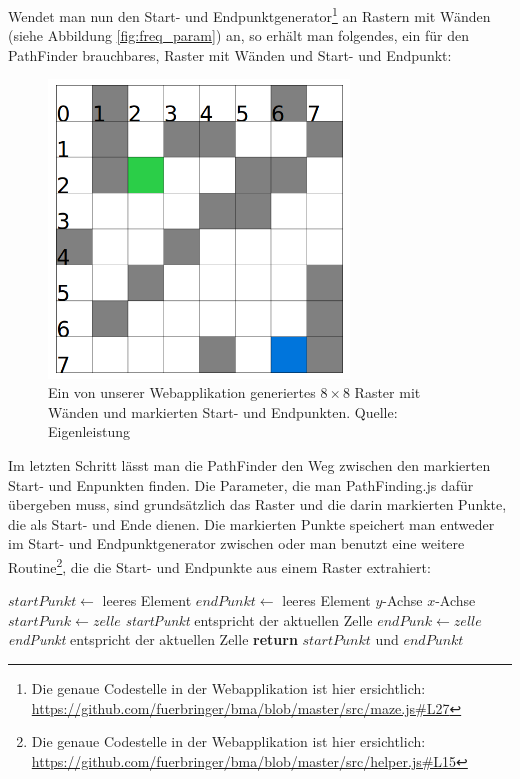 \documentclass[12pt,a4paper,german]{report}
\begin{document}
Wendet man nun den Start- und Endpunktgenerator\footnote{Die genaue Codestelle in der Webapplikation ist hier ersichtlich: \url{https://github.com/fuerbringer/bma/blob/master/src/maze.js\#L27}} an Rastern mit Wänden (siehe Abbildung \ref{fig:freq_param}) an, so erhält man folgendes, ein für den PathFinder brauchbares, Raster mit Wänden und Start- und Endpunkt:
\begin{figure}[H]
  \centering
  \includegraphics[width=8cm]{grid2}
  \caption[Ein von unserer Webapplikation generiertes $8\times8$ Raster mit Wänden und markierten Start- und Endpunkten.]{Ein von unserer Webapplikation generiertes $8\times8$ Raster mit Wänden und markierten Start- und Endpunkten. Quelle: Eigenleistung}
  \label{fig:grid2}
\end{figure}
Im letzten Schritt lässt man die PathFinder den Weg zwischen den markierten Start- und Enpunkten finden. Die Parameter, die man PathFinding.js dafür übergeben muss, sind grundsätzlich das Raster und die darin markierten Punkte, die als Start- und Ende dienen. Die markierten Punkte speichert man entweder im Start- und Endpunktgenerator zwischen oder man benutzt eine weitere Routine\footnote{Die genaue Codestelle in der Webapplikation ist hier ersichtlich: \url{https://github.com/fuerbringer/bma/blob/master/src/helper.js\#L15}}, die die Start- und Endpunkte aus einem Raster extrahiert:
\begin{algorithmic}[1]
  \State $startPunkt \gets$ leeres Element
  \State $endPunkt \gets$ leeres Element
   \Comment $y$-Achse
     \Comment $x$-Achse
      \State $startPunk \gets zelle$ \Comment \textit{startPunkt} entspricht der aktuellen Zelle
      \State $endPunk \gets zelle$ \Comment \textit{endPunkt} entspricht der aktuellen Zelle
    \EndIf
    \EndFor
  \EndFor
  \State \textbf{return} $startPunkt$ und $endPunkt$
  \EndProcedure
\end{algorithmic}
\end{document}

